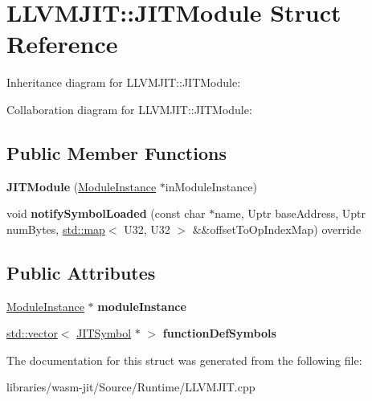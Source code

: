 \hypertarget{struct_l_l_v_m_j_i_t_1_1_j_i_t_module}{}\section{L\+L\+V\+M\+J\+IT\+:\+:J\+I\+T\+Module Struct Reference}
\label{struct_l_l_v_m_j_i_t_1_1_j_i_t_module}


Inheritance diagram for L\+L\+V\+M\+J\+IT\+:\+:J\+I\+T\+Module\+:


Collaboration diagram for L\+L\+V\+M\+J\+IT\+:\+:J\+I\+T\+Module\+:
\subsection*{Public Member Functions}
\begin{DoxyCompactItemize}
\item 
\mbox{\label{struct_l_l_v_m_j_i_t_1_1_j_i_t_module_a7295c4919ebeced6bf21e5f91d51e948}} 
{\bfseries J\+I\+T\+Module} (\mbox{\hyperlink{struct_runtime_1_1_module_instance}{Module\+Instance}} $\ast$in\+Module\+Instance)
\item 
\mbox{\label{struct_l_l_v_m_j_i_t_1_1_j_i_t_module_a4a112ec7e03f0226bf632c7c55fd8d27}} 
void {\bfseries notify\+Symbol\+Loaded} (const char $\ast$name, Uptr base\+Address, Uptr num\+Bytes, \mbox{\hyperlink{classstd_1_1map}{std\+::map}}$<$ U32, U32 $>$ \&\&offset\+To\+Op\+Index\+Map) override
\end{DoxyCompactItemize}
\subsection*{Public Attributes}
\begin{DoxyCompactItemize}
\item 
\mbox{\label{struct_l_l_v_m_j_i_t_1_1_j_i_t_module_a253cdd08826388a982c7d6425621d74a}} 
\mbox{\hyperlink{struct_runtime_1_1_module_instance}{Module\+Instance}} $\ast$ {\bfseries module\+Instance}
\item 
\mbox{\label{struct_l_l_v_m_j_i_t_1_1_j_i_t_module_a9573d54684a655e34e5715c697e5c701}} 
\mbox{\hyperlink{classstd_1_1vector}{std\+::vector}}$<$ \mbox{\hyperlink{struct_l_l_v_m_j_i_t_1_1_j_i_t_symbol}{J\+I\+T\+Symbol}} $\ast$ $>$ {\bfseries function\+Def\+Symbols}
\end{DoxyCompactItemize}


The documentation for this struct was generated from the following file\+:\begin{DoxyCompactItemize}
\item 
libraries/wasm-\/jit/\+Source/\+Runtime/L\+L\+V\+M\+J\+I\+T.\+cpp\end{DoxyCompactItemize}

